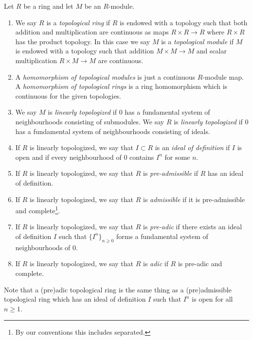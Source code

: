 \begin{definition}
\label{definition-topological-ring}
\begin{reference}
\cite[Chapter 0, Sections 7.1 and 7.2]{EGA1}
\end{reference}
Let $R$ be a ring and let $M$ be an $R$-module.
\begin{enumerate}
\item We say $R$ is a {\it topological ring} if $R$ is endowed with a topology
such that both addition and multiplication are continuous as maps
$R \times R \to R$ where $R \times R$ has the product topology.
In this case we say $M$ is a {\it topological module} if $M$ is endowed
with a topology such that addition $M \times M \to M$ and
scalar multiplication $R \times M \to M$ are continuous.
\item A {\it homomorphism of topological modules} is just a continuous
$R$-module map. A {\it homomorphism of topological rings} is a
ring homomorphism which is continuous for the given topologies.
\item We say $M$ is {\it linearly topologized} if $0$ has a fundamental
system of neighbourhoods consisting of submodules. We say $R$ is
{\it linearly topologized} if $0$ has a fundamental system of neighbourhoods
consisting of ideals.
\item If $R$ is linearly topologized, we say that $I \subset R$ is an
{\it ideal of definition} if $I$ is open and if every neighbourhood
of $0$ contains $I^n$ for some $n$.
\item If $R$ is linearly topologized, we say that $R$ is {\it pre-admissible}
if $R$ has an ideal of definition.
\item If $R$ is linearly topologized, we say that $R$ is {\it admissible} if
it is pre-admissible and
complete\footnote{By our conventions this includes separated.}.
\item If $R$ is linearly topologized, we say that $R$ is {\it pre-adic} if
there exists an ideal of definition $I$ such that $\{I^n\}_{n \geq 0}$
forms a fundamental system of neighbourhoods of $0$.
\item If $R$ is linearly topologized, we say that $R$ is {\it adic} if
$R$ is pre-adic and complete.
\end{enumerate}
Note that a (pre)adic topological ring is the same thing as a (pre)admissible
topological ring which has an ideal of definition $I$ such that $I^n$ is
open for all $n \geq 1$.
\end{definition}


